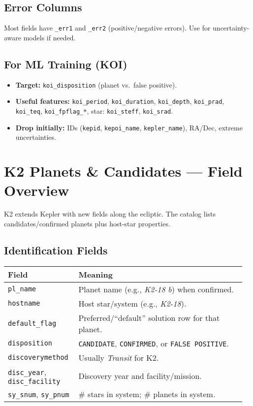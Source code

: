 \documentclass{article}
\begin{document}
\subsection*{Error Columns}
Most fields have \texttt{\_err1} and \texttt{\_err2} (positive/negative errors). Use for uncertainty-aware models if needed.

\subsection*{For ML Training (KOI)}
\begin{itemize}
  \item \textbf{Target:} \texttt{koi\_disposition} (planet vs.\ false positive).
  \item \textbf{Useful features:} \texttt{koi\_period}, \texttt{koi\_duration}, \texttt{koi\_depth}, \texttt{koi\_prad}, \texttt{koi\_teq}, \texttt{koi\_fpflag\_*}, star: \texttt{koi\_steff}, \texttt{koi\_srad}.
  \item \textbf{Drop initially:} IDs (\texttt{kepid}, \texttt{kepoi\_name}, \texttt{kepler\_name}), RA/Dec, extreme uncertainties.
\end{itemize}

\section*{K2 Planets \& Candidates --- Field Overview}

K2 extends Kepler with new fields along the ecliptic. The catalog lists candidates/confirmed planets plus host-star properties.

\subsection*{Identification Fields}
\begin{tabular}{@{}p{0.28\linewidth} p{0.68\linewidth}@{}}
\toprule
\textbf{Field} & \textbf{Meaning} \\ \midrule
\texttt{pl\_name} & Planet name (e.g., \emph{K2-18 b}) when confirmed. \\
\texttt{hostname} & Host star/system (e.g., \emph{K2-18}). \\
\texttt{default\_flag} & Preferred/``default'' solution row for that planet. \\
\texttt{disposition} & \texttt{CANDIDATE}, \texttt{CONFIRMED}, or \texttt{FALSE POSITIVE}. \\
\texttt{discoverymethod} & Usually \emph{Transit} for K2. \\
\texttt{disc\_year}, \texttt{disc\_facility} & Discovery year and facility/mission. \\
\texttt{sy\_snum}, \texttt{sy\_pnum} & \# stars in system; \# planets in system. \\
\bottomrule
\end{tabular}
\end{document}
